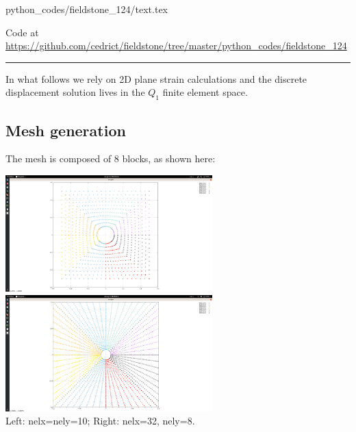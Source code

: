 \begin{flushright} {\tiny {\color{gray} python\_codes/fieldstone\_124/text.tex}} \end{flushright}



\begin{center}

Code at \url{https://github.com/cedrict/fieldstone/tree/master/python_codes/fieldstone_124}
\end{center}

\par\noindent\rule{\textwidth}{0.4pt}


In what follows we rely on 2D plane strain calculations and the discrete displacement 
solution lives in the $Q_1$ finite element space.

\subsection*{Mesh generation}

The mesh is composed of 8 blocks, as shown here:

\begin{center}
\includegraphics[width=8cm]{python_codes/fieldstone_124/results/mesh1}
\includegraphics[width=8cm]{python_codes/fieldstone_124/results/mesh3}\\
{\captionfont Left: nelx=nely=10; Right: nelx=32, nely=8.}
\end{center}

